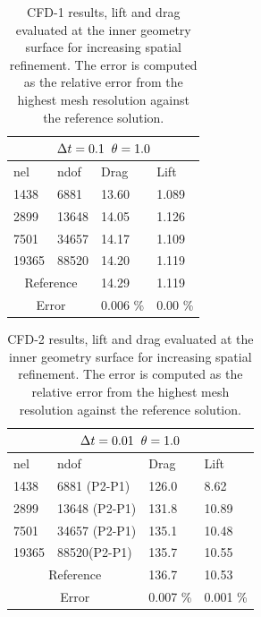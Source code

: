 \begin{table}[h!]
\centering
\begin{tabular}{ |p{1cm}||p{2.7cm}|p{3.3cm}|p{3.3cm}|}
\hline
  \multicolumn{4}{|c|}{$\Delta t = 0.1 \hspace{2mm} \theta = 1.0$} \\
\hline
nel & ndof & Drag  & Lift \\
\hline
 1438    & 6881   & 13.60 & 1.089  \\
 2899    & 13648  & 14.05 & 1.126 \\
 7501    & 34657  & 14.17   & 1.109 \\
 19365   & 88520  & 14.20 & 1.119 \\
  \hline
  \multicolumn{2}{|c|}{Reference}  & 14.29   & 1.119\\
   \hline
    \multicolumn{2}{|c|}{Error}  & 0.006 \%   & 0.00 \%\\
   \hline
\end{tabular}
\caption{CFD-1 results, lift and drag evaluated at the inner geometry surface for increasing spatial refinement. The error is computed as the relative error from the highest mesh resolution against the reference solution.}
\label{table:cfd1}
\end{table}

\newpage

\begin{table}[h!]
\centering
\label{CFD-2 Results}
\begin{tabular}{ |p{1cm}||p{2.7cm}|p{3.3cm}|p{3.3cm}|}
 \hline
  \multicolumn{4}{|c|}{$\Delta t = 0.01 \hspace{2mm} \theta = 1.0$} \\
   \hline
nel & ndof & Drag  & Lift \\
\hline
 1438    & 6881 (P2-P1)  & 126.0 &  8.62 \\
 2899    & 13648  (P2-P1)& 131.8 & 10.89  \\
 7501    & 34657 (P2-P1) & 135.1 & 10.48  \\
 19365   & 88520(P2-P1)  & 135.7 & 10.55  \\
 \hline
  \multicolumn{2}{|c|}{Reference}  & 136.7   & 10.53\\
   \hline
    \multicolumn{2}{|c|}{Error}  & 0.007 \%   & 0.001 \%\\
   \hline
\end{tabular}
\caption{CFD-2 results, lift and drag evaluated at the inner geometry surface for increasing spatial refinement. The error is computed as the relative error from the highest mesh resolution against the reference solution.}
\label{table:cfd2}
\end{table}

